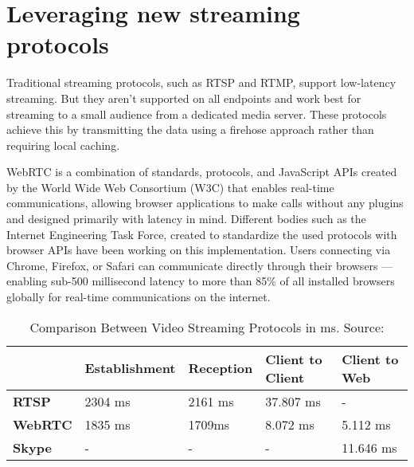\newpage
\section{Leveraging new streaming protocols}


Traditional streaming protocols, such as RTSP and RTMP, support low-latency streaming. But they aren’t supported on all endpoints and work best for streaming to a small audience from a dedicated media server. These protocols achieve this by transmitting the data using a firehose approach rather than requiring local caching.

WebRTC is a combination of standards, protocols, and JavaScript APIs created by the World Wide Web Consortium (W3C) that enables real-time communications, allowing browser applications to make calls without any plugins and designed primarily with latency in mind. Different bodies such as the Internet Engineering Task Force, created to standardize the used protocols with browser APIs have been working on this implementation. Users connecting via Chrome, Firefox, or Safari can communicate directly through their browsers — enabling sub-500 millisecond latency to more than 85\% of all installed browsers globally for real-time communications on the internet.

\begin{table}[!ht]
           \begin{threeparttable}
        \caption{Comparison Between Video Streaming Protocols in ms. Source: \cite{impl-analysis-rtsp}}
        \label{tab:video-stream-protocols}
        \setlength\tabcolsep{1pt} %
        
        \begin{tabular*}{\columnwidth}{@{\extracolsep{\fill}} lllll}
        \toprule
              &Establishment  &Reception  &Client to Client&Client to Web\\
        \midrule
              \textbf{RTSP} &2304 ms & 2161 ms & 37.807 ms & -\\
        \addlinespace
             \textbf{WebRTC} &1835 ms &1709ms&8.072 ms & 5.112 ms \\
        \addlinespace
              \textbf{Skype} &-&-&-&11.646 ms\\
        \bottomrule
        \end{tabular*}
        
        \smallskip
        \scriptsize
           \end{threeparttable}
        \end{table}

